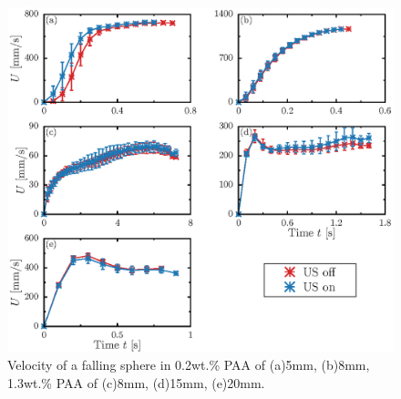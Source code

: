 \begin{figure}[H]
    \centering
    \includegraphics[width=1\textwidth]{X-Appendix/diameter-0.2_1.3/diameter.eps}
    \caption{Velocity of a falling sphere in 0.2wt.\% PAA of (a)5mm, (b)8mm, 1.3wt.\% PAA of (c)8mm, (d)15mm, (e)20mm.}
    \label{fig:diameter-0.2-1.3}
\end{figure}
